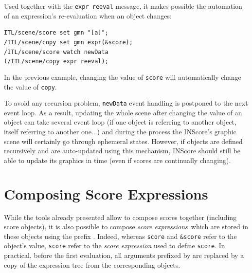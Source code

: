 \documentclass{article}
\newcommand{\OSC}[1]{\texttt{#1}}
\newcommand{\param}[1]{\textcolor{figOrange}{#1}}
\newcommand{\prefix}[1]{\textcolor{figBlue}{#1}}
\newcommand{\sExpr}{\emph{score expressions}}
\newcommand{\lowTilde}{\texttildelow}
\newcommand{\sample}	[1]			{\vspace{-0.2em}\begin{center}\colorbox{mygrey}{\begin{minipage}[t]{0.95\columnwidth} {\small \texttt{#1}}\end{minipage}}\end{center}}
\begin{document}
Used together with the \OSC{expr reeval} message, it makes possible the automation of an expression's re-evaluation when an object changes:
\sample{ITL/scene/score set gmn "[a]";\\
/ITL/scene/copy set gmn expr(\&score);\\
/ITL/scene/score watch newData\\   
\hspace*{8mm}(/ITL/scene/copy expr reeval);
}
In the previous example, changing the value of \OSC{score} will automatically change the value of \OSC{copy}.

To avoid any recursion problem, \OSC{newData} event handling is postponed to the next event loop. As a result, updating the whole scene after changing the value of an object can take several event loop (if one object is referring to another object, itself referring to another one...) and during the process the INScore's graphic scene will certainly go through ephemeral states. However, if objects are defined recursively and are auto-updated using this mechanism, INScore should still be able to update its graphics in time (even if scores are continually changing).

\section{Composing Score Expressions}
\label{composingExpr}
 While the tools already presented allow to compose scores together (including score objects), it is also possible to compose \sExpr\ which are stored in these objects using the prefix \OSC{\prefix{\lowTilde}}. Indeed, whereas \OSC{\param{score}} and \OSC{\prefix{\&}\param{score}} refer to the object's value, \OSC{\prefix{\lowTilde}\param{score}} refer to the \emph{score expression} used to define \OSC{score}. In practical, before the first evaluation, all arguments prefixed by \OSC{\prefix{\lowTilde}} are replaced by a copy of the expression tree from the corresponding objects.
\end{document}
